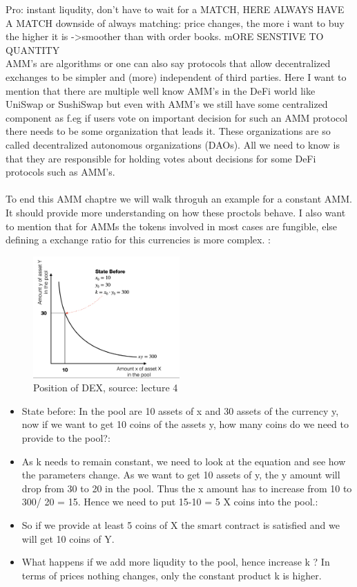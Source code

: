 \documentclass{article}
\begin{document}
Pro: instant liqudity, don't have to wait for a MATCH, HERE ALWAYS HAVE A MATCH
downside of always matching: price changes, the more i want to buy the higher it is ->smoother than with order books. mORE SENSTIVE TO QUANTITY\\


AMM's are algorithms or one can also say protocols that allow decentralized exchanges to be simpler and (more) independent of third parties. Here I want to mention that there are multiple well know AMM's in the DeFi world like UniSwap or SushiSwap but even with AMM's we still have some centralized component as f.eg if users vote on important decision for such an AMM protocol there needs to be some organization that leads it. These organizations are so called decentralized autonomous organizations (DAOs). All we need to know is that they are responsible for holding votes about decisions for some DeFi protocols such as AMM's.\\
\\
To end this AMM chaptre we will walk throguh an example for a constant AMM. It should provide more understanding on how these proctols behave. I also want to mention that for AMMs the tokens involved in most cases are fungible, else defining a exchange ratio for this currencies is more complex. :\\
\begin{figure}[h]
    \centering
    \includegraphics[width=0.5\textwidth]{Bildschirmfoto 2024-04-02 um 15.16.43.png} %
    \caption{Position of DEX, \scriptsize{source: lecture 4}}
    \label{fig:DoS-attack}
\end{figure}
\begin{itemize}
    \item {State before: In the pool are 10 assets of x and 30 assets of the currency y, now if we want to get 10 coins of the assets y, how many coins do we need to provide to the pool?}: 
    \item {As k needs to remain constant, we need to look at the equation and see how the parameters change. As we want to get 10 assets of y, the y amount will drop from 30 to 20 in the pool. Thus the x amount has to increase from 10 to 300/ 20 = 15. Hence we need to put 15-10 = 5 X coins into the pool.}:  
    \item {So if we provide at least 5 coins of X the smart contract is satisfied and we will get 10 coins of Y.}
\item {What happens if we add more liqudity to the pool, hence increase k ? In terms of prices nothing changes, only the constant product k is higher.}



\end{itemize}
\end{document}
